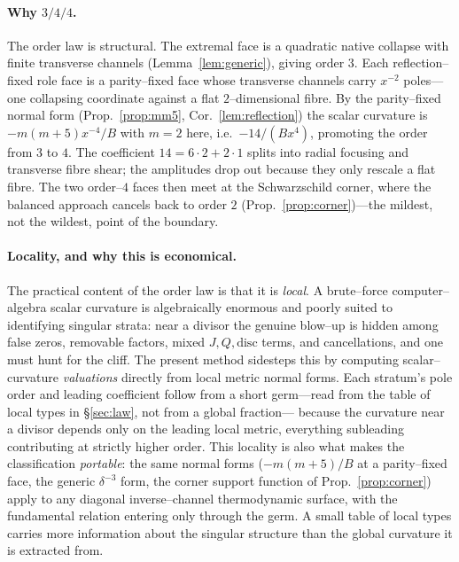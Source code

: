 \documentclass[11pt]{article}
\begin{document}
\paragraph{Why $3/4/4$.}
The order law is structural. The extremal face is a quadratic native collapse with finite
transverse channels (Lemma~\ref{lem:generic}), giving order $3$. Each reflection--fixed role face
is a parity--fixed face whose transverse channels carry $x^{-2}$ poles---one collapsing
coordinate against a flat $2$--dimensional fibre. By the parity--fixed normal form
(Prop.~\ref{prop:mm5}, Cor.~\ref{lem:reflection}) the scalar curvature is
$-m(m+5)x^{-4}/B$ with $m=2$ here, i.e.\ $-14/(Bx^4)$, promoting the order from $3$ to $4$. The
coefficient $14=6\cdot2+2\cdot1$ splits into radial focusing and transverse fibre shear; the
amplitudes drop out because they only rescale a flat fibre. The two order--$4$ faces then meet
at the Schwarzschild corner, where the balanced approach cancels back to order $2$
(Prop.~\ref{prop:corner})---the mildest, not the wildest, point of the boundary.

\paragraph{Locality, and why this is economical.}
The practical content of the order law is that it is \emph{local}. A brute--force
computer--algebra scalar curvature is algebraically enormous and poorly suited to identifying
singular strata: near a divisor the genuine blow--up is hidden among false zeros, removable
factors, mixed $J,Q,\mathrm{disc}$ terms, and cancellations, and one must hunt for the cliff.
The present method sidesteps this by computing scalar--curvature \emph{valuations} directly from
local metric normal forms. Each stratum's pole order and leading coefficient follow from a short
germ---read from the table of local types in \S\ref{sec:law}, not from a global fraction---%
because the curvature near a divisor depends only on the leading local metric, everything
subleading contributing at strictly higher order. This locality is also what makes the
classification \emph{portable}: the same normal forms ($-m(m+5)/B$ at a parity--fixed face, the
generic $\delta^{-3}$ form, the corner support function of Prop.~\ref{prop:corner}) apply to any
diagonal inverse--channel thermodynamic surface, with the fundamental relation entering only
through the germ. A small table of local types carries more information about the singular
structure than the global curvature it is extracted from.
\end{document}
